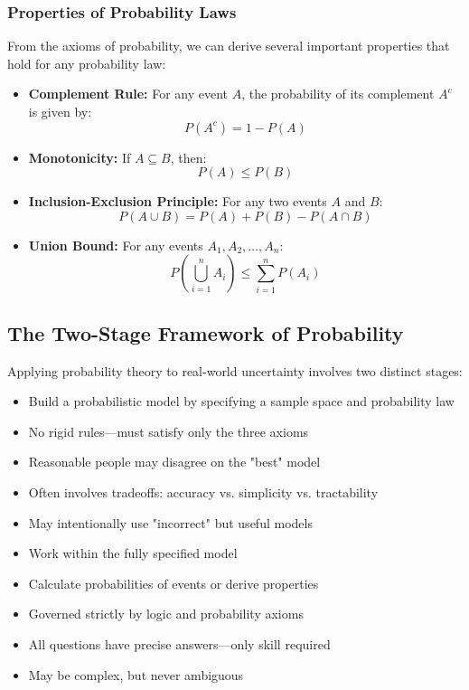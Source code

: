 \begin{itemize}
\subsubsection{Properties of Probability Laws}

From the axioms of probability, we can derive several important properties that hold for any probability law:
\begin{itemize}
    \item \textbf{Complement Rule:} For any event \(A\), the probability of its complement \(A^c\) is given by:
    \[ P(A^c) = 1 - P(A) \]
    \item \textbf{Monotonicity:} If \(A \subseteq B\), then:
    \[ P(A) \leq P(B) \]
    \item \textbf{Inclusion-Exclusion Principle:} For any two events \(A\) and \(B\):
    \[ P(A \cup B) = P(A) + P(B) - P(A \cap B) \]
    \item \textbf{Union Bound:} For any events \(A_1, A_2, \ldots, A_n\):
    \[ P\left(\bigcup_{i=1}^{n} A_i\right) \leq \sum_{i=1}^{n} P(A_i) \]
\end{itemize}

\subsection{The Two-Stage Framework of Probability}

Applying probability theory to real-world uncertainty involves two distinct stages:

\begin{itemize}
    \item Build a probabilistic model by specifying a sample space and probability law
    \item No rigid rules—must satisfy only the three axioms
    \item Reasonable people may disagree on the "best" model
    \item Often involves tradeoffs: accuracy vs. simplicity vs. tractability
    \item May intentionally use "incorrect" but useful models
\end{itemize}

\begin{itemize}
    \item Work within the fully specified model
    \item Calculate probabilities of events or derive properties
    \item Governed strictly by logic and probability axioms
    \item All questions have precise answers—only skill required
    \item May be complex, but never ambiguous
\end{itemize}


\end{itemize}
